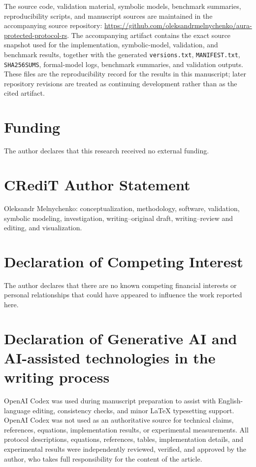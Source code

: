 \documentclass[preprint,12pt]{elsarticle}
\theoremstyle{definition}
\begin{document}
The source code, validation material, symbolic models, benchmark summaries,
reproducibility scripts, and manuscript sources are maintained in the
accompanying source repository:
\url{https://github.com/oleksandrmelnychenko/aura-protected-protocol-rs}.
The accompanying artifact contains the exact source snapshot used for the
implementation, symbolic-model, validation, and benchmark results, together
with the generated \texttt{versions.txt}, \texttt{MANIFEST.txt},
\texttt{SHA256SUMS}, formal-model logs, benchmark summaries, and validation
outputs. These files are the reproducibility record for the results in this
manuscript; later repository revisions are treated as continuing development
rather than as the cited artifact.

\section*{Funding}

The author declares that this research received no external funding.

\section*{CRediT Author Statement}

Oleksandr Melnychenko: conceptualization, methodology, software,
validation, symbolic modeling, investigation, writing--original draft,
writing--review and editing, and visualization.

\section*{Declaration of Competing Interest}

The author declares that there are no known competing financial
interests or personal relationships that could have appeared to
influence the work reported here.

\section*{Declaration of Generative AI and AI-assisted technologies in the writing process}

OpenAI Codex was used during manuscript preparation to assist with
English-language editing, consistency checks, and minor \LaTeX{}
typesetting support. OpenAI Codex was not used as an authoritative
source for technical claims, references, equations, implementation
results, or experimental measurements. All protocol descriptions,
equations, references, tables, implementation details, and experimental
results were independently reviewed, verified, and approved by the
author, who takes full responsibility for the content of the article.
\end{document}
